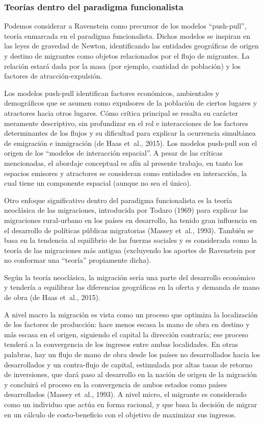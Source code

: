 \documentclass[12pt,spanish,]{article}
\begin{document}
\hypertarget{teoruxedas-dentro-del-paradigma-funcionalista}{%
\subsubsection{Teorías dentro del paradigma
funcionalista}\label{teoruxedas-dentro-del-paradigma-funcionalista}}

Podemos considerar a Ravenstein como precursor de los modelos
``push-pull'', teoría enmarcada en el paradigma funcionalista. Dichos
modelos se inspiran en las leyes de gravedad de Newton, identificando
las entidades geográficas de origen y destino de migrantes como objetos
relacionados por el flujo de migrantes. La relación estará dada por la
masa (por ejemplo, cantidad de población) y los factores de
atracción-expulsión.

Los modelos push-pull identifican factores económicos, ambientales y
demográficos que se asumen como expulsores de la población de ciertos
lugares y atractores hacia otros lugares. Cómo crítica principal se
resalta su carácter meramente descriptivo, sin profundizar en el rol e
interacciones de los factores determinantes de los flujos y su
dificultad para explicar la ocurrencia simultánea de emigración e
inmigración (de Haas et~al., 2015). Los modelos push-pull son el origen
de los ``modelos de interacción espacial''. A pesar de las críticas
mencionadas, el abordaje conceptual es afín al presente trabajo, en
tanto los espacios emisores y atractores se consideran como entidades en
interacción, la cual tiene un componente espacial (aunque no sea el
único).

Otro enfoque significativo dentro del paradigma funcionalista es la
teoría neoclásica de las migraciones, introducida por Todaro (1969) para
explicar las migraciones rural-urbano en los países en desarrollo, ha
tenido gran influencia en el desarrollo de políticas públicas
migratorias (Massey et~al., 1993). También se basa en la tendencia al
equilibrio de las fuerzas sociales y es considerada como la teoría de
las migraciones más antigua (excluyendo los aportes de Ravenstein por no
conformar una ``teoría'' propiamente dicha).

Según la teoría neoclásica, la migración sería una parte del desarrollo
económico y tendería a equilibrar las diferencias geográficas en la
oferta y demanda de mano de obra (de Haas et~al., 2015).

A nivel macro la migración es vista como un proceso que optimiza la
localización de los factores de producción: hace menos escasa la mano de
obra en destino y más escasa en el origen, siguiendo el capital la
dirección contraría; ese proceso tenderá a la convergencia de los
ingresos entre ambas localidades. En otras palabras, hay un flujo de
mano de obra desde los países no desarrollados hacia los desarrollados y
un contra-flujo de capital, estimulada por altas tasas de retorno de
inversiones, que dará paso al desarrollo en la nación de origen de la
migración y concluirá el proceso en la convergencia de ambos estados
como países desarrollados (Massey et~al., 1993). A nivel micro, el
migrante es considerado como un individuo que actúa en forma racional, y
que basa la decisión de migrar en un cálculo de costo-beneficio con el
objetivo de maximizar sus ingresos.
\end{document}
